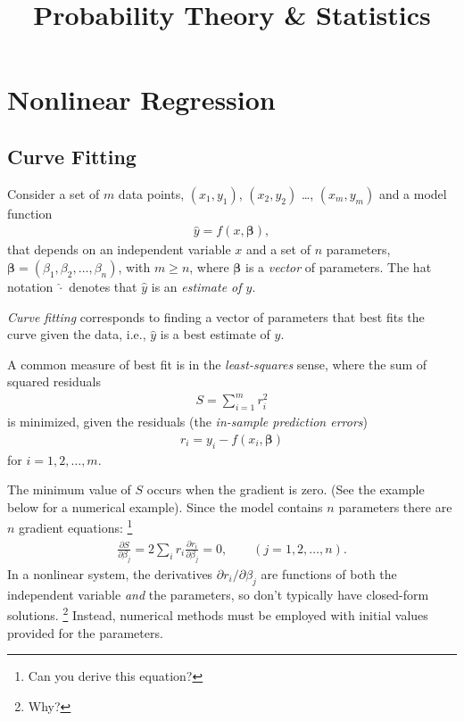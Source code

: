 \documentclass[11pt,a4paper]{article}
\title{Probability Theory \& Statistics}
\begin{document}
\maketitle
\newpage

\section{Nonlinear Regression}

\subsection{Curve Fitting}

Consider a set of \(m\) data points, \((x_{1},y_{1})\), \((x_{2},y_{2})\)
\ldots, \((x_{m},y_{m})\) and a model function
\begin{align}
\widehat{y} = f\left( x,\boldsymbol{\beta} \right),
\end{align}
that depends on an independent variable \(x\) and a set of \(n\) parameters, 
\(\boldsymbol{\beta} = (\beta_{1},\beta_{2},\ldots,\beta_{n})\),
with \(m \geq n\), 
where \(\boldsymbol{\beta}\) is a \emph{vector} of parameters. 
The hat notation \(\widehat{\cdot}\) denotes that \(\widehat{y}\) is an \emph{estimate of \(y\)}. 

\emph{Curve fitting} corresponds to finding a vector of parameters 
that best fits the curve given the data,
i.e., \(\widehat{y}\) is a best estimate of \(y\).

A common measure of best fit is in the \emph{least-squares} sense, 
where the sum of squared residuals
\begin{align}
S = \sum_{i = 1}^{m}r_{i}^{2}
\end{align}
is minimized, given the residuals (the \emph{in-sample prediction errors})
\begin{align}
r_{i} = y_{i} - f(x_{i},\boldsymbol{\beta})
\end{align}
for \(i = 1,2,\ldots,m\).

The minimum value of \(S\) occurs when the gradient is zero. 
(See the example below for a numerical example). 
Since the model contains \(n\) parameters there are \(n\) gradient equations:%
\footnote{Can you derive this equation?}
\begin{align}
\frac{\partial S}{\partial\beta_{j}} = 
2\sum_{i}^{}r_{i}\frac{\partial r_{i}}{\partial\beta_{j}} = 0,\qquad (j = 1,2,\ldots,n).
\end{align}
In a nonlinear system, 
the derivatives \(\partial r_{i}/\partial\beta_{j}\) are functions of both the
independent variable \emph{and} the parameters, 
so don't typically have closed-form solutions.%
\footnote{Why?} 
Instead, numerical methods must be
employed with initial values provided for the parameters.
\end{document}
